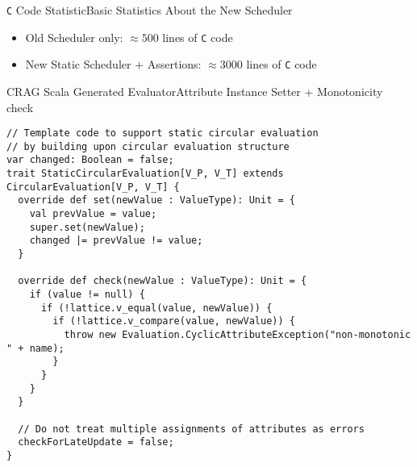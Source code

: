 

\begin{frame}{\texttt{C} Code Statistic}{Basic Statistics About the New Scheduler}
    \begin{itemize}
        \item Old Scheduler only: $\approx500$ lines of \texttt{C} code
        \item New Static Scheduler + \alert{Assertions}: $\approx 3000$ lines of \texttt{C} code
    \end{itemize}
\end{frame}



\begin{frame}[fragile=singleslide]{CRAG Scala Generated Evaluator}{Attribute Instance Setter + Monotonicity check}
\begin{Verbatim}[fontsize=\scriptsize]
// Template code to support static circular evaluation
// by building upon circular evaluation structure
var changed: Boolean = false;
trait StaticCircularEvaluation[V_P, V_T] extends CircularEvaluation[V_P, V_T] {
  override def set(newValue : ValueType): Unit = {
    val prevValue = value;
    super.set(newValue);
    changed |= prevValue != value;
  }

  override def check(newValue : ValueType): Unit = {
    if (value != null) {
      if (!lattice.v_equal(value, newValue)) {
        if (!lattice.v_compare(value, newValue)) {
          throw new Evaluation.CyclicAttributeException("non-monotonic " + name);
        }
      }
    }
  }
  
  // Do not treat multiple assignments of attributes as errors
  checkForLateUpdate = false;
}
\end{Verbatim}
\end{frame}



